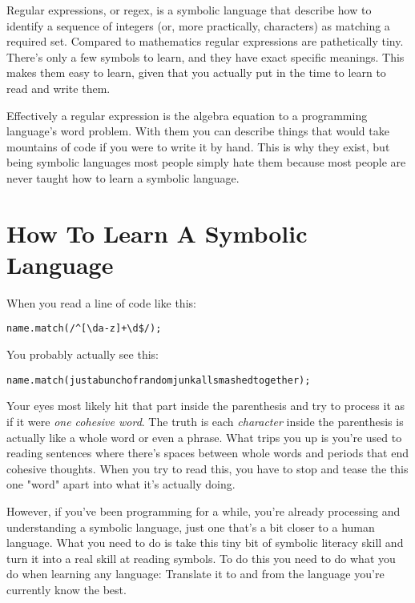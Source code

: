 Regular expressions, or regex, is a symbolic language that describe how to
identify a sequence of integers (or, more practically, characters) as matching
a required set.  Compared to mathematics regular expressions are pathetically
tiny.  There's only a few symbols to learn, and they have exact specific meanings.
This makes them easy to learn, given that you actually put in the time to 
learn to read and write them.

Effectively a regular expression is the algebra equation to a programming
language's word problem.  With them you can describe things that would take
mountains of code if you were to write it by hand.  This is why they exist,
but being symbolic languages most people simply hate them because most
people are never taught how to learn a symbolic language.


\section{How To Learn A Symbolic Language}

When you read a line of code like this:

\begin{lstlisting}
name.match(/^[\da-z]+\d$/);
\end{lstlisting}

You probably actually see this:

\begin{lstlisting}
name.match(justabunchofrandomjunkallsmashedtogether);
\end{lstlisting}

Your eyes most likely hit that part inside the parenthesis and try to process it as if it were
\emph{one cohesive word}.  The truth is each \emph{character} inside the parenthesis is actually
like a whole word or even a phrase.  What trips you up is you're used to reading sentences where
there's spaces between whole words and periods that end cohesive thoughts.  When you try to 
read this, you have to stop and tease the this one "word" apart into what it's actually doing.

However, if you've been programming for a while, you're already processing and understanding
a symbolic language, just one that's a bit closer to a human language.  What you need to do
is take this tiny bit of symbolic literacy skill and turn it into a real skill at reading
symbols.  To do this you need to do what you do when learning any language: Translate it
to and from the language you're currently know the best.

